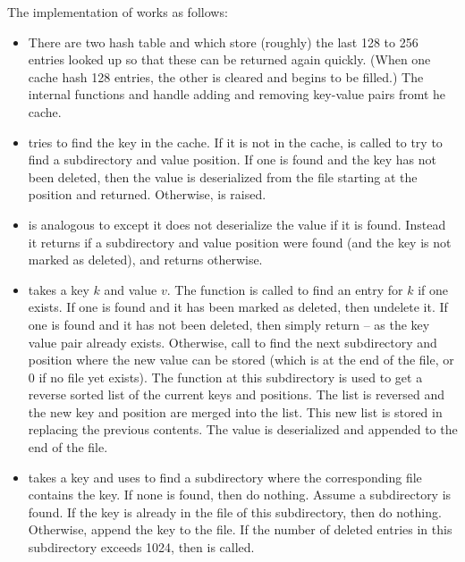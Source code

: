 The implementation of {} works as follows:
\begin{itemize}
\item There are two hash table {} and {}
which store (roughly) the last 128 to 256 entries looked up
so that these can be returned again quickly.
(When one cache hash 128 entries, the other is cleared and begins
to be filled.)
The internal functions {} and {}
handle adding and removing key-value pairs fromt he cache.
\item {} tries to find the key in the cache.
If it is not in the cache, {} is called to 
try to find a subdirectory and value position.
If one is found and the key has not been deleted, then
the value is deserialized from the {} file starting at the position
and returned.
Otherwise, {} is raised.
\item {} is analogous to {} except it
does not deserialize the value if it is found.
Instead it returns {} if a subdirectory and value position were found
(and the key is not marked as deleted),
and returns {} otherwise.
\item {} takes a key $k$ and value $v$.
The function {} is called to find an entry for $k$ if one exists.
If one is found and it has been marked as deleted, then undelete it.
If one is found and it has not been deleted, then simply return -- as the
key value pair already exists.
Otherwise, call {} to find the next subdirectory
and position where the new value can be stored (which is at the end of the {} file,
or $0$ if no {} file yet exists).
The function {} at this subdirectory is used
to get a reverse sorted list of the current keys and positions.
The list is reversed and the new key and position are merged into the list.
This new list is stored in {} replacing the previous contents.
The value is deserialized and appended to the end of the {} file.
\item {} takes a key and uses {} to find a subdirectory
where the corresponding {} file contains the key.
If none is found, then do nothing.
Assume a subdirectory is found.
If the key is already in the {} file of this subdirectory, then do nothing.
Otherwise, append the key to the {} file.
If the number of deleted entries in this subdirectory exceeds 1024, then {} is called.
\end{itemize}

